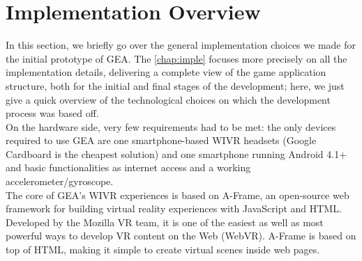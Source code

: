 \section{Implementation Overview}
In this section, we briefly go over the general implementation choices we made for the
initial prototype of GEA. The \autoref{chap:imple} focuses more precisely on all the implementation details, delivering a complete view of the game application structure, both for the initial and final stages of the development; here, we just give a quick overview of the technological choices on which the development process was based off.\\
On the hardware side, very few requirements had to be met: the only devices required to use GEA are one smartphone-based WIVR headsets (Google Cardboard is the cheapest solution) and one smartphone running Android 4.1+ and basic functionalities as internet access and a working accelerometer/gyroscope.\\
The core of GEA's WIVR experiences is based on A-Frame, an open-source web framework for building virtual reality experiences with JavaScript and HTML. Developed by the Mozilla VR team, it is one of the easiest as well as most powerful ways to develop VR content on the Web (WebVR). A-Frame is based on top of HTML, making it simple to create virtual scenes inside web pages.\\

